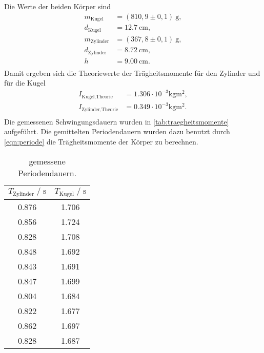\sloppy Die Werte der beiden Körper sind
\begin{align*}
  m_{\text{Kugel}} &= (810,9 \pm 0,1)\:\si{\gram}, \\
  d_{\text{Kugel}} &= \SI{12,7}{\centi\meter}, \\
  m_{\text{Zylinder}} &= (367,8\pm 0,1)\:\si{\gram}, \\
  d_{\text{Zylinder}} &=  \SI{8,72}{\centi\meter}, \\
  h &= \SI{9,00}{\centi\meter}. \\
\end{align*}
Damit ergeben sich die Theoriewerte der Trägheitsmomente für den Zylinder und für die Kugel
\begin{align*}
  I_{\text{Kugel,Theorie}} &= 1.306 \cdot 10^{-3} \si{\kilogram\meter^2}, \\
  I_{\text{Zylinder,Theorie}} &= 0.349 \cdot 10^{-3} \si{\kilogram\meter^2}. \\
\end{align*}
Die gemessenen Schwingungsdauern wurden in \autoref{tab:traegheitsmomente} aufgeführt. Die gemittelten Periodendauern wurden dazu benutzt
durch \autoref{eqn:periode} die Trägheitsmomente der Körper zu berechnen.

\begin{table}[H]
  \centering
   \caption{gemessene Periodendauern.}
   \label{tab:traegheitsmomente}
   \begin{tabular}{c c}
      \toprule
      $ T_{\text{Zylinder}} \;/\; \si{\second}$ & $ T_{\text{Kugel}} \;/\; \si{\second}$ \\
      \midrule
      0.876 & 1.706 \\
      0.856 & 1.724 \\
      0.828 & 1.708 \\
      0.848 & 1.692 \\
      0.843 & 1.691 \\
      0.847 & 1.699 \\
      0.804 & 1.684 \\
      0.822 & 1.677 \\
      0.862 & 1.697 \\
      0.828 & 1.687 \\
      \bottomrule
   \end{tabular}
\end{table}

